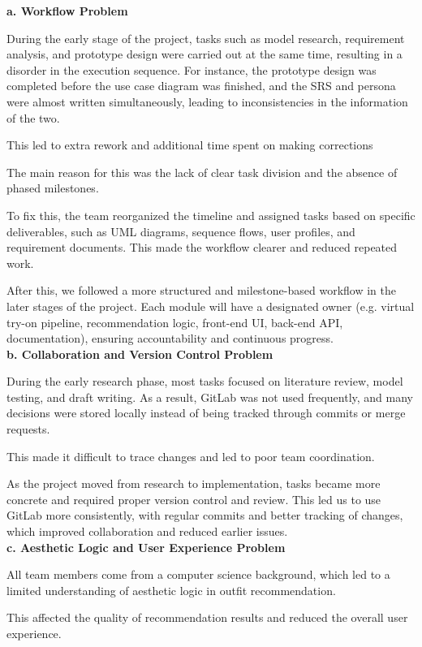 \textbf{\large a. Workflow Problem}

During the early stage of the project, tasks such as model research, requirement analysis, and prototype design were carried out at the same time, resulting in a disorder in the execution sequence. For instance, the prototype design was completed before the use case diagram was finished, and the SRS and persona were almost written simultaneously, leading to inconsistencies in the information of the two.

This led to extra rework and additional time spent on making corrections

The main reason for this was the lack of clear task division and the absence of phased milestones.

To fix this, the team reorganized the timeline and assigned tasks based on specific deliverables, such as UML diagrams, sequence flows, user profiles, and requirement documents. This made the workflow clearer and reduced repeated work.

After this, we followed a more structured and milestone-based workflow in the later stages of the project. Each module will have a designated owner (e.g. virtual try-on pipeline, recommendation logic, front-end UI, back-end API, documentation), ensuring accountability and continuous progress.\\


\textbf{\large b. Collaboration and Version Control Problem}

During the early research phase, most tasks focused on literature review, model testing, and draft writing. As a result, GitLab was not used frequently, and many decisions were stored locally instead of being tracked through commits or merge requests.

This made it difficult to trace changes and led to poor team coordination.

As the project moved from research to implementation, tasks became more concrete and required proper version control and review. This led us to use GitLab more consistently, with regular commits and better tracking of changes, which improved collaboration and reduced earlier issues.\\

\textbf{\large c. Aesthetic Logic and User Experience Problem}

All team members come from a computer science background, which led to a limited understanding of aesthetic logic in outfit recommendation.

This affected the quality of recommendation results and reduced the overall user experience.

